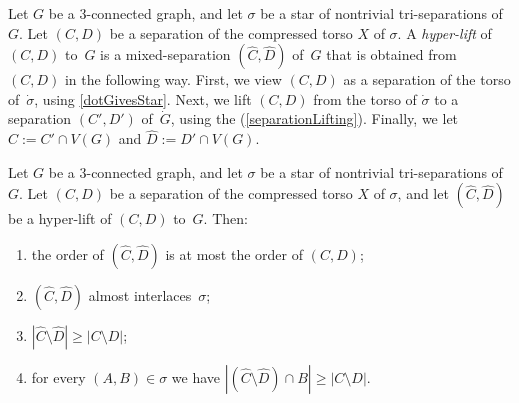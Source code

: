 \documentclass{aic}
\theoremstyle{plain}
\theoremstyle{definition}
\theoremstyle{plain}
\theoremstyle{plain}
\newcommand{\sm}{\setminus}
\renewcommand{\geq}{\geqslant}
\begin{document}
\begin{dfn}
Let $G$ be a 3-connected graph, and let $\sigma$ be a star of nontrivial tri-separations of~$G$.
Let $(C,D)$ be a separation of the compressed torso $X$ of $\sigma$.
A \emph{hyper-lift} of $(C,D)$ to~$G$ is a mixed-separation $(\hat C,\hat D)$ of~$G$ that is obtained from $(C,D)$ in the following way.
First, we view $(C,D)$ as a separation of the torso of~$\dot\sigma$, using \autoref{dotGivesStar}.
Next, we lift $(C,D)$ from the torso of $\dot\sigma$ to a separation $(C',D')$ of~$\dot G$, using the  (\ref{separationLifting}).
Finally, we let $\hat C:=C'\cap V(G)$ and $\hat D:=D'\cap V(G)$.
\end{dfn}

\begin{lem}\label{HyperLiftIsUseful}
Let $G$ be a 3-connected graph, and let $\sigma$ be a star of nontrivial tri-separations of~$G$.
Let $(C,D)$ be a separation of the compressed torso $X$ of $\sigma$, and let $(\hat C,\hat D)$ be a hyper-lift of $(C,D)$ to~$G$.
Then:
\begin{enumerate}
    \item the order of $(\hat C,\hat D)$ is at most the order of $(C,D)$;
    \item $(\hat C,\hat D)$ almost interlaces~$\sigma$;
   \item $|\hat C\sm \hat D|\geq |C\sm D|$;
   \item  for every $(A,B)\in \sigma$ we have $|(\hat C\sm \hat D)\cap B|\geq |C\sm D|$.
\end{enumerate}
\end{lem}
\end{document}
